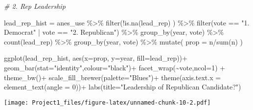 \documentclass[
]{article}
\newenvironment{Shaded}{\begin{snugshade}}{\end{snugshade}}
\newcommand{\AttributeTok}[1]{\textcolor[rgb]{0.77,0.63,0.00}{#1}}
\newcommand{\CommentTok}[1]{\textcolor[rgb]{0.56,0.35,0.01}{\textit{#1}}}
\newcommand{\DecValTok}[1]{\textcolor[rgb]{0.00,0.00,0.81}{#1}}
\newcommand{\FunctionTok}[1]{\textcolor[rgb]{0.00,0.00,0.00}{#1}}
\newcommand{\NormalTok}[1]{#1}
\newcommand{\OtherTok}[1]{\textcolor[rgb]{0.56,0.35,0.01}{#1}}
\newcommand{\SpecialCharTok}[1]{\textcolor[rgb]{0.00,0.00,0.00}{#1}}
\newcommand{\StringTok}[1]{\textcolor[rgb]{0.31,0.60,0.02}{#1}}
\begin{document}
\begin{Shaded}
\begin{Highlighting}[]
\CommentTok{\# 2. Rep Leadership}

\NormalTok{lead\_rep\_hist }\OtherTok{=}\NormalTok{ anes\_use }\SpecialCharTok{\%\textgreater{}\%}
  \FunctionTok{filter}\NormalTok{(}\SpecialCharTok{!}\FunctionTok{is.na}\NormalTok{(lead\_rep) ) }\SpecialCharTok{\%\textgreater{}\%}
  \FunctionTok{filter}\NormalTok{(vote }\SpecialCharTok{==} \StringTok{"1. Democrat"} \SpecialCharTok{|}\NormalTok{ vote }\SpecialCharTok{==} \StringTok{"2. Republican"}\NormalTok{) }\SpecialCharTok{\%\textgreater{}\%}
  \FunctionTok{group\_by}\NormalTok{(year, vote) }\SpecialCharTok{\%\textgreater{}\%}
  \FunctionTok{count}\NormalTok{(lead\_rep) }\SpecialCharTok{\%\textgreater{}\%}
  \FunctionTok{group\_by}\NormalTok{(year, vote) }\SpecialCharTok{\%\textgreater{}\%}
  \FunctionTok{mutate}\NormalTok{(}
    \AttributeTok{prop =}\NormalTok{ n}\SpecialCharTok{/}\FunctionTok{sum}\NormalTok{(n)}
\NormalTok{  )}

\FunctionTok{ggplot}\NormalTok{(lead\_rep\_hist,}
       \FunctionTok{aes}\NormalTok{(}\AttributeTok{x=}\NormalTok{prop, }\AttributeTok{y=}\NormalTok{year, }\AttributeTok{fill=}\NormalTok{lead\_rep))}\SpecialCharTok{+}
  \FunctionTok{geom\_bar}\NormalTok{(}\AttributeTok{stat=}\StringTok{"identity"}\NormalTok{,}\AttributeTok{colour=}\StringTok{"black"}\NormalTok{)}\SpecialCharTok{+}
  \FunctionTok{facet\_wrap}\NormalTok{(}\SpecialCharTok{\textasciitilde{}}\NormalTok{vote,}\AttributeTok{ncol=}\DecValTok{1}\NormalTok{) }\SpecialCharTok{+}
  \FunctionTok{theme\_bw}\NormalTok{()}\SpecialCharTok{+}
  \FunctionTok{scale\_fill\_brewer}\NormalTok{(}\AttributeTok{palette=}\StringTok{"Blues"}\NormalTok{)}\SpecialCharTok{+}
  \FunctionTok{theme}\NormalTok{(}\AttributeTok{axis.text.x =} \FunctionTok{element\_text}\NormalTok{(}\AttributeTok{angle =} \DecValTok{0}\NormalTok{))}\SpecialCharTok{+}
  \FunctionTok{labs}\NormalTok{(}\AttributeTok{title=}\StringTok{"Leadership of Republican Candidate?"}\NormalTok{)}
\end{Highlighting}
\end{Shaded}

\texttt{[image: Project1\_files/figure-latex/unnamed-chunk-10-2.pdf]}
\end{document}
